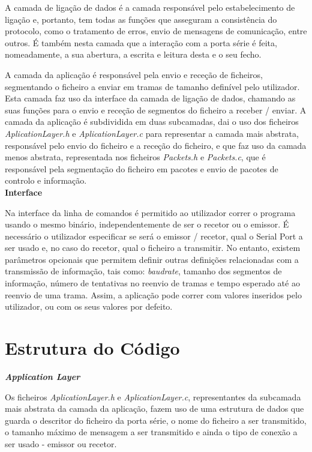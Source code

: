 \documentclass[a4paper, 11pt]{article}
\begin{document}
A camada de ligação de dados é a camada responsável pelo estabelecimento de ligação e, portanto, tem todas as funções que asseguram a consistência do protocolo, como o tratamento de erros, envio de mensagens de comunicação, entre outros. É também nesta camada que a interação com a porta série é feita, nomeadamente, a sua abertura, a escrita e leitura desta e o seu fecho.

A camada da aplicação é responsável pela envio e receção de ficheiros, segmentando o ficheiro a enviar em tramas de tamanho definível pelo utilizador. Esta camada faz uso da interface da camada de ligação de dados, chamando as suas funções para o envio e receção de segmentos do ficheiro a receber / enviar. A camada da aplicação é subdividida em duas subcamadas, dai o uso dos ficheiros \textit{AplicationLayer.h} e \textit{AplicationLayer.c} para representar a camada mais abstrata, responsável pelo envio do ficheiro e a receção do ficheiro, e que faz uso da camada menos abstrata, representada nos ficheiros  \textit{Packets.h} e \textit{Packets.c}, que é responsável pela segmentação do ficheiro em pacotes e envio de pacotes de controlo e informação.\\

\large\textbf{Interface}\\
\normalsize

Na interface da linha de comandos é permitido ao utilizador correr o programa usando o mesmo binário, independentemente de ser o recetor ou o emissor.
É necessário o utilizador especificar se será o emissor / recetor, qual o Serial Port a ser usado e, no caso do recetor, qual o ficheiro a transmitir. No entanto, existem parâmetros opcionais que permitem definir outras definições relacionadas com a transmissão de informação, tais como: \textit{baudrate}, tamanho dos segmentos de informação, número de tentativas no reenvio de tramas e tempo esperado até ao reenvio de uma trama.
Assim, a aplicação pode correr com valores inseridos pelo utilizador, ou com os seus valores por defeito.

\section{Estrutura do Código}

\large\textbf{\textit{Application Layer}}\\
\normalsize

Os ficheiros \textit{AplicationLayer.h} e \textit{AplicationLayer.c}, representantes da subcamada mais abstrata da camada da aplicação, fazem uso de uma estrutura de dados que guarda o descritor do ficheiro da porta série, o nome do ficheiro a ser transmitido, o tamanho máximo de mensagem a ser transmitido e ainda o tipo de conexão a ser usado - emissor ou recetor.
\end{document}
